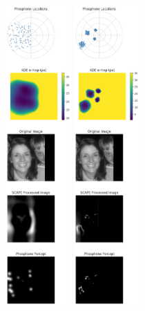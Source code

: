 \begin{figure}[ht!]
    \includegraphics[width=0.223\textwidth]{figures/implant schemes/1 utah array.png}
    \includegraphics[width=0.223\textwidth]{figures/implant schemes/4 utah arrays.png}

\end{figure}
